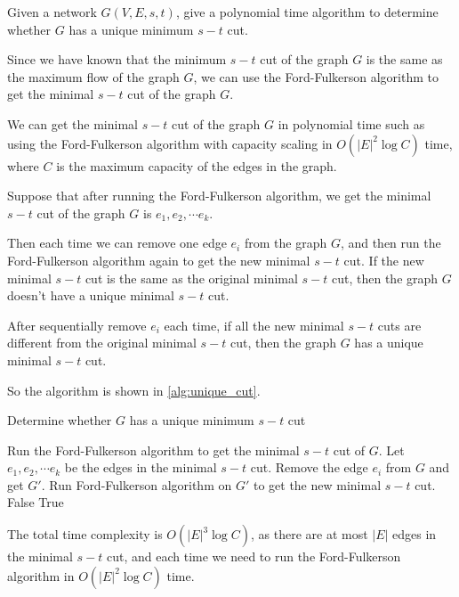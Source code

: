 \problem{}
Given a network $G(V, E, s, t)$, give a polynomial time algorithm to determine whether $G$ has a unique minimum $s-t$ cut.

\solution{}
Since we have known that the minimum $s-t$ cut of the graph $G$ is the same as the maximum flow of the graph $G$, we can use the Ford-Fulkerson algorithm to get the minimal $s-t$ cut of the graph $G$.

We can get the minimal $s-t$ cut of the graph $G$ in polynomial time such as using the Ford-Fulkerson algorithm with capacity scaling in $O(|E|^2\log C)$ time, where $C$ is the maximum capacity of the edges in the graph.

Suppose that after running the Ford-Fulkerson algorithm, we get the minimal $s-t$ cut of the graph $G$ is $e_1, e_2, \cdots e_k$.

Then each time we can remove one edge $e_i$ from the graph $G$, and then run the Ford-Fulkerson algorithm again to get the new minimal $s-t$ cut. If the new minimal $s-t$ cut is the same as the original minimal $s-t$ cut, then the graph $G$ doesn't have a unique minimal $s-t$ cut.

After sequentially remove $e_i$ each time, if all the new minimal $s-t$ cuts are different from the original minimal $s-t$ cut, then the graph $G$ has a unique minimal $s-t$ cut.

So the algorithm is shown in \ref{alg:unique_cut}.

\begin{algorithm}
\caption{Determine whether $G$ has a unique minimum $s-t$ cut}
\begin{algorithmic}[1]
\State Run the Ford-Fulkerson algorithm to get the minimal $s-t$ cut of $G$.
\State Let $e_1, e_2, \cdots e_k$ be the edges in the minimal $s-t$ cut.
    \State Remove the edge $e_i$ from $G$ and get $G'$.
    \State Run Ford-Fulkerson algorithm on $G'$ to get the new minimal $s-t$ cut.
        \State \Return False
    \EndIf
\EndFor
\State \Return True
\end{algorithmic}
\label{alg:unique_cut}
\end{algorithm}

The total time complexity is $O(|E|^3\log C)$, as there are at most $|E|$ edges in the minimal $s-t$ cut, and each time we need to run the Ford-Fulkerson algorithm in $O(|E|^2\log C)$ time.\\

\newpage